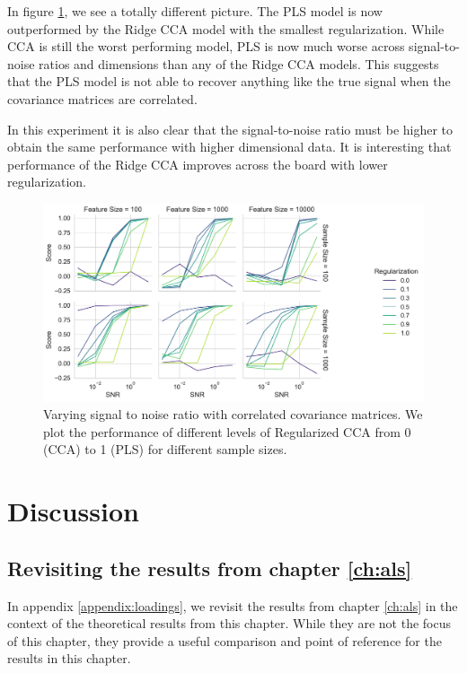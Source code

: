 In figure \ref{fig:snr-scores-random}, we see a totally different picture.
The PLS model is now outperformed by the Ridge CCA model with the smallest regularization.
While CCA is still the worst performing model, PLS is now much worse across signal-to-noise ratios and dimensions than any of the Ridge CCA models.
This suggests that the PLS model is not able to recover anything like the true signal when the covariance matrices are correlated.


In this experiment it is also clear that the signal-to-noise ratio must be higher to obtain the same performance with higher dimensional data.
It is interesting that performance of the Ridge CCA improves across the board with lower regularization.


\begin{figure}
    \centering
    \includegraphics[width=\linewidth]{figures/brain_behaviour_sim/snr_vs_scores_facet_random}
    \caption{Varying signal to noise ratio with correlated covariance matrices. We plot the performance of different levels of Regularized CCA from 0 (CCA) to 1 (PLS) for different sample sizes.}\label{fig:snr-scores-random}
\end{figure}

\section{Discussion}

\subsection{Revisiting the results from chapter \ref{ch:als}}

In appendix \ref{appendix:loadings}, we revisit the results from chapter \ref{ch:als} in the context of the theoretical results from this chapter. While they are not the focus of this chapter, they provide a useful comparison and point of reference for the results in this chapter.

